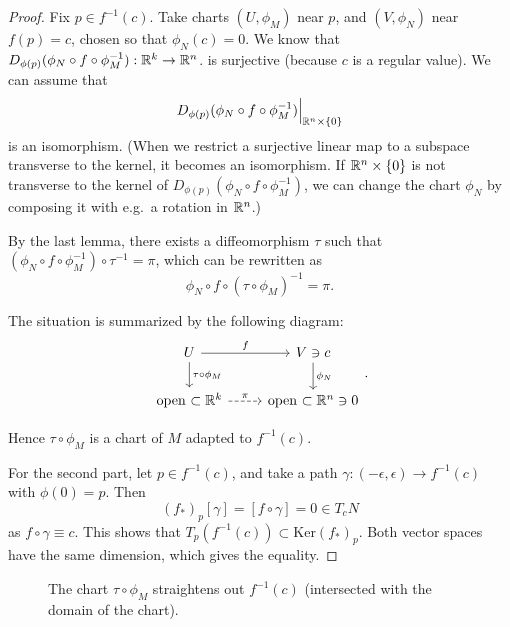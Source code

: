 \begin{proof}
    Fix $p \in f ^{-1}(c)$.
    Take charts $(U, \phi_M)$ near $p$,
    and  $(V, \phi_N)$ near  $f(p)=c$, chosen so that  $\phi_N(c)=0$.
    We know that $D_{\phi(p)}(\phi_N  \circ  f  \circ  \phi_M^{-1}) : \mathbb{R}^k \to  \mathbb{R}^n$. is surjective (because $c$ is a regular value). We can assume that
    \[
        D_{\phi(p)}(\phi_N  \circ  f  \circ  \phi_M^{-1})\Big|_{\mathbb{R}^{n} \times \{0\} }
    \] 
    is an isomorphism. (When we restrict a surjective linear map to a subspace
     transverse to the kernel, it becomes an isomorphism. If $\mathbb{R}^{n} \times \{0\}$ is not transverse to the kernel of $D_{\phi(p)}(\phi_N  \circ  f  \circ  \phi_M^{-1}) $, we can change the chart $\phi_N$ by composing it with e.g.\ a rotation in $\mathbb{R}^n$.)

    By the last lemma, there exists a diffeomorphism $\tau$ such that $ (\phi_N  \circ  f  \circ  \phi_M^{-1})\circ  \tau^{-1} = \pi$, which can be rewritten as
    \[
        \phi_N  \circ  f  \circ  (\tau  \circ  \phi_M)^{-1} = \pi
    .\] 

The situation is summarized by the following diagram:
    \[
        \begin{tikzcd}
            U \arrow[r, "f"] \arrow[d, "\tau  \circ  \phi_M"]& V \ni c \arrow[d, "\phi_N"] \\
            \text{open $\subset \R^k$} \arrow[r, dashed, "\pi"]& \text{open $\subset \R^n \ni 0$}
        \end{tikzcd}
    .\] 

    Hence $\tau  \circ  \phi_M$ is a chart of $M$ adapted to $f^{-1}(c)$.

    \hr

    For the second part,
    let $p \in  f^{-1}(c)$, and take a path $\gamma: (-\epsilon, \epsilon) \to  f^{-1}(c)$ with $\phi(0) = p$.
    Then $$(f_*)_p [\gamma] = [f  \circ  \gamma] = 0 \in T_c N$$ as $f  \circ  \gamma \equiv c$.
    This shows that $T_p (f^{-1}(c)) \subset \text{Ker}(f_*)_p$.
    Both vector spaces have the same dimension, which gives the equality.
\end{proof}

\begin{figure}[ht]
    \centering
    \caption{The chart $\tau  \circ  \phi_M$  straightens out
  $f^{-1}(c)$ (intersected with the domain of the chart).}
    \label{fig:example-submersion}
\end{figure}
